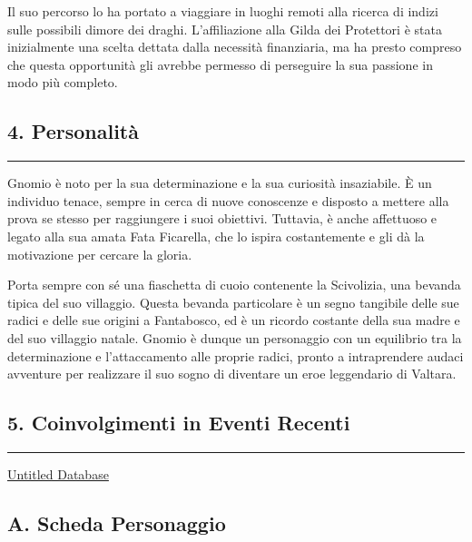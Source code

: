 Il suo percorso lo ha portato a viaggiare in luoghi remoti alla ricerca
di indizi sulle possibili dimore dei draghi. L'affiliazione alla Gilda
dei Protettori è stata inizialmente una scelta dettata dalla necessità
finanziaria, ma ha presto compreso che questa opportunità gli avrebbe
permesso di perseguire la sua passione in modo più completo.

\subsection{4. Personalità}\label{personalituxe0}

\begin{center}\rule{0.5\linewidth}{0.5pt}\end{center}

Gnomio è noto per la sua determinazione e la sua curiosità insaziabile.
È un individuo tenace, sempre in cerca di nuove conoscenze e disposto a
mettere alla prova se stesso per raggiungere i suoi obiettivi. Tuttavia,
è anche affettuoso e legato alla sua amata Fata Ficarella, che lo ispira
costantemente e gli dà la motivazione per cercare la gloria.

Porta sempre con sé una fiaschetta di cuoio contenente la Scivolizia,
una bevanda tipica del suo villaggio. Questa bevanda particolare è un
segno tangibile delle sue radici e delle sue origini a Fantabosco, ed è
un ricordo costante della sua madre e del suo villaggio natale. Gnomio è
dunque un personaggio con un equilibrio tra la determinazione e
l'attaccamento alle proprie radici, pronto a intraprendere audaci
avventure per realizzare il suo sogno di diventare un eroe leggendario
di Valtara.

\subsection{5. Coinvolgimenti in Eventi
Recenti}\label{coinvolgimenti-in-eventi-recenti}

\begin{center}\rule{0.5\linewidth}{0.5pt}\end{center}

\href{Untitled\%20Database\%20d34cea32615c443298a3760e892662b8.csv}{Untitled
Database}

\subsection{A. Scheda Personaggio}\label{a.-scheda-personaggio}

